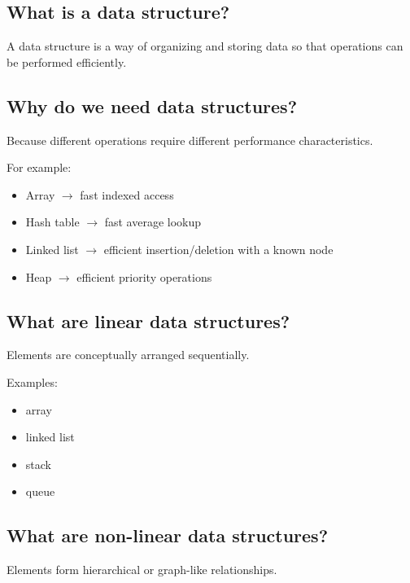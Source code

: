 \subsection{What is a data structure?}

A data structure is a way of organizing and storing data so that operations can be performed efficiently.

\medskip

\subsection{Why do we need data structures?}

Because different operations require different performance characteristics.

For example:

\begin{itemize}
  \item Array $\rightarrow$ fast indexed access
  \item Hash table $\rightarrow$ fast average lookup
  \item Linked list $\rightarrow$ efficient insertion/deletion with a known node
  \item Heap $\rightarrow$ efficient priority operations
\end{itemize}

\medskip

\subsection{What are linear data structures?}

Elements are conceptually arranged sequentially.

Examples:

\begin{itemize}
  \item array
  \item linked list
  \item stack
  \item queue
\end{itemize}

\medskip

\subsection{What are non-linear data structures?}

Elements form hierarchical or graph-like relationships.

